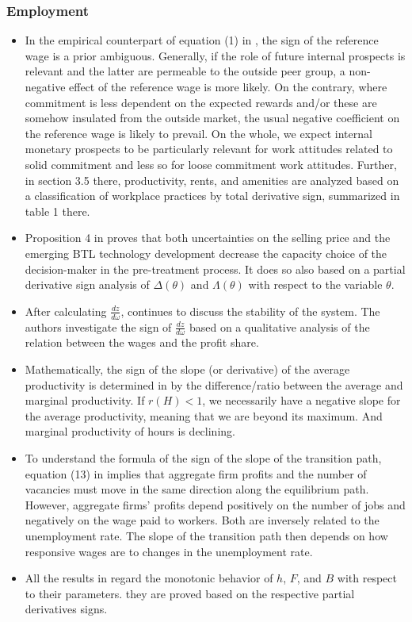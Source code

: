 \documentclass[11pt]{book}
\begin{document}
\subsubsection{Employment}
\begin{itemize}
\item In the empirical counterpart of equation (1) in \cite{cristini2007high},
the sign of the reference wage is a prior ambiguous. Generally, if
the role of future internal prospects is relevant and the latter are
permeable to the outside peer group, a non-negative effect of the
reference wage is more likely. On the contrary, where commitment is
less dependent on the expected rewards and/or these are somehow insulated
from the outside market, the usual negative coefficient on the reference
wage is likely to prevail. On the whole, we expect internal monetary
prospects to be particularly relevant for work attitudes related to
solid commitment and less so for loose commitment work attitudes.
Further, in section 3.5 there, productivity, rents, and amenities
are analyzed based on a classification of workplace practices by total
derivative sign, summarized in table 1 there.
\item Proposition 4 in \cite{visschers2007employment}
proves that both uncertainties on the selling price and the emerging
BTL technology development decrease the capacity choice of the decision-maker
in the pre-treatment process. It does so also based on a partial derivative
sign analysis of $\Delta\left(\theta\right)$ and $\Lambda\left(\theta\right)$
with respect to the variable $\theta$.
\item After calculating $\frac{dz}{d\omega}$, \cite{schutz2009endogeneity}
continues to discuss the stability of the system. The authors investigate
the sign of $\frac{dz}{d\omega}$ based on a qualitative analysis
of the relation between the wages and the profit share.
\item Mathematically, the sign of the slope (or derivative) of the average
productivity is determined in \cite{delmez2018long}
by the difference/ratio between the average and marginal productivity.
If $r\left(H\right)<1$, we necessarily have a negative slope for
the average productivity, meaning that we are beyond its maximum.
And marginal productivity of hours is declining.
\item To understand the formula of the sign of the slope of the transition
path, equation (13) in \cite{carrillo2018unemployment}
implies that aggregate firm profits and the number of vacancies must
move in the same direction along the equilibrium path. However, aggregate
firms' profits depend positively on the number of jobs and negatively
on the wage paid to workers. Both are inversely related to the unemployment
rate. The slope of the transition path then depends on how responsive
wages are to changes in the unemployment rate.
\item All the results in \cite{di2019envelope}
regard the monotonic behavior of $h$, $F$, and $B$ with respect
to their parameters. they are proved based on the respective partial
derivatives signs.
\end{itemize}
\end{document}
